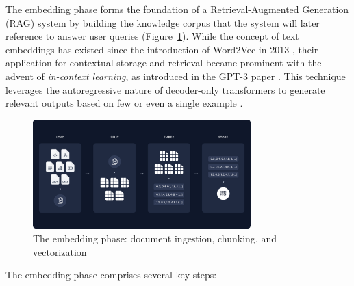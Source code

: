 The embedding phase forms the foundation of a Retrieval-Augmented Generation (RAG) system by building the knowledge corpus that the system will later reference to answer user queries (Figure~\ref{fig:embedding_phase}). While the concept of text embeddings has existed since the introduction of Word2Vec in 2013 \cite{mikolov2013efficient}, their application for contextual storage and retrieval became prominent with the advent of \textit{in-context learning}, as introduced in the GPT-3 paper \cite{brown2020language}. This technique leverages the autoregressive nature of decoder-only transformers to generate relevant outputs based on few or even a single example \cite{bashir2023context}.

\begin{figure}[h]
    \centering
    \includegraphics[width=0.75\textwidth]{images/lagchain-rag-embedding.png}
    \caption{The embedding phase: document ingestion, chunking, and vectorization~\cite{langchain_rag}}
    \label{fig:embedding_phase}
\end{figure}

The embedding phase comprises several key steps:

